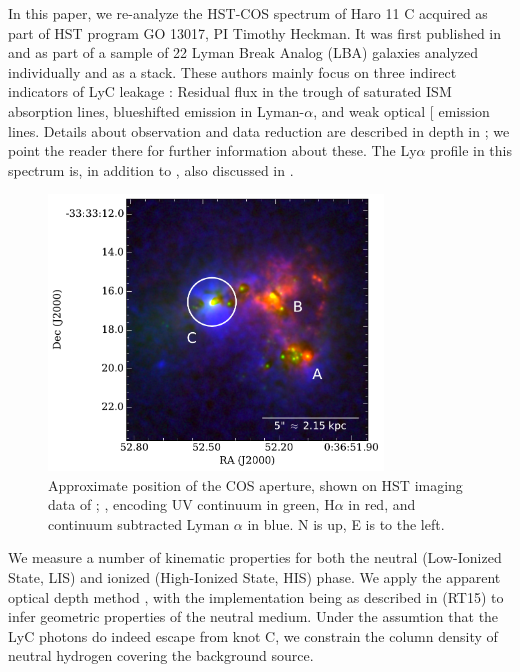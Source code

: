 \documentclass[twocolumn,]{aastex61}
\begin{document}
In this paper, we re-analyze the HST-COS spectrum of Haro 11 C acquired
as part of HST program GO 13017, PI Timothy Heckman. It was first
published in \citet{Alexandroff2015} and \citet{Heckman2015} as part of
a sample of 22 Lyman Break Analog (LBA) galaxies analyzed individually
and as a stack. These authors mainly focus on three indirect indicators
of LyC leakage \citep{Overzier2009, Heckman2011}: Residual flux in the
trough of saturated ISM absorption lines, blueshifted emission in
Lyman-$\alpha$, and weak optical {[}\ion{S}{2}{]} emission lines.
Details about observation and data reduction are described in depth in
\citet{Alexandroff2015}; we point the reader there for further
information about these. The Ly$\alpha$ profile in this spectrum is, in
addition to \citet{Heckman2011}, also discussed in \citet{Verhamme2015}.

\begin{figure}
\centering
\includegraphics[width=3.500in]{../Figs/Haroslit.pdf}
\caption{Approximate position of the COS aperture, shown on HST imaging
data of \citet{Hayes2009}; \citet{Ostlin2009}, encoding UV continuum in
green, H$\alpha$ in red, and continuum subtracted Lyman $\alpha$ in
blue. N is up, E is to the left.}\label{fig:apert}
\end{figure}

We measure a number of kinematic properties for both the neutral (Low-Ionized
State, LIS) and ionized (High-Ionized State, HIS) phase. We apply the apparent
optical depth method \citep[AOD, ][]{Savage1991, Pettini2002, Quider2009,
Jones2013}, with the implementation being as described in
\citet{RiveraThorsen2015} (RT15) to infer geometric properties of the neutral
medium. Under the assumtion that the LyC photons do indeed escape from knot C,
we constrain the column density of neutral hydrogen covering the background
source.  
\end{document}
